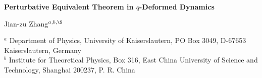 \documentclass[a4paper,12pt]{article}
\begin{document}
  \thispagestyle{empty}
  \pagestyle{empty}
  \renewcommand{\thefootnote}{\fnsymbol{footnote}}
\newpage\normalsize
    \pagestyle{plain}
    \setlength{\baselineskip}{4ex}\par
    \setcounter{footnote}{0}
    \renewcommand{\thefootnote}{\arabic{footnote}}
\newcommand{\preprint}[1]{%
  \begin{flushright}
    \setlength{\baselineskip}{3ex} #1
  \end{flushright}}
\renewcommand{\title}[1]{%
  \begin{center}
    \LARGE #1
  \end{center}\par}
\renewcommand{\author}[1]{%
  \vspace{2ex}
  {\Large
   \begin{center}
     \setlength{\baselineskip}{3ex} #1 \par
   \end{center}}}
\renewcommand{\thanks}[1]{\footnote{#1}}
\begin{flushright}
\end{flushright}
\vskip 0.5cm

\begin{center}
{\large \bf Perturbative Equivalent Theorem in $q$-Deformed Dynamics}
\end{center}
\vspace{1cm}
\begin{center}
Jian-zu Zhang$^{a,b, \S}$
\end{center}
\vspace{1cm}
\begin{center}
$^a$  Department of Physics,
University of Kaiserslautern, PO Box 3049, D-67653  Kaiserslautern, Germany \\
$^b$ Institute for Theoretical Physics, Box 316,
East China University of Science and Technology, 
Shanghai 200237, P. R. China
\end{center}
\vspace{1cm}
\end{document}

